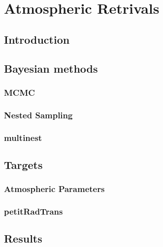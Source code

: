\chapter{Atmospheric Retrivals}
\section{Introduction}
\section{Bayesian methods}
\subsection{MCMC}
\subsection{Nested Sampling}
\subsection{multinest}
\section{Targets}
\subsection{Atmospheric Parameters}
\subsection{petitRadTrans}
\section{Results}